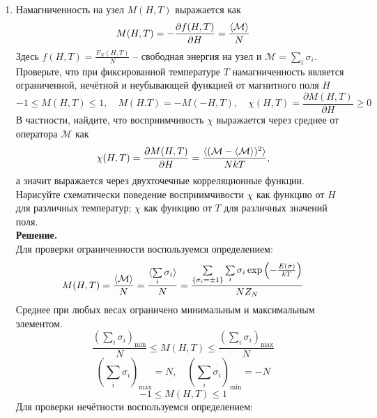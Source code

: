 \documentclass[12pt]{article}
\theoremstyle{definition}
\begin{document}
\begin{enumerate}
    \item Намагниченность на узел $M(H,T)$ выражается как
    \begin{equation}
        M(H,T)=-\frac{\partial f(H,T)}{\partial H}=\frac{\braket{\mathcal{M}}}{N}
    \end{equation}
    Здесь $f(H,T)=\frac{F_N(H,T)}{N}$ -- свободная энергия на узел и $\mathcal{M}=\sum\limits_i\sigma_i$. Проверьте, что при фиксированной температуре $T$ намагниченность является ограниченной, нечётной и неубывающей функцией от магнитного поля $H$
    \begin{equation}
        -1\leq M(H,T)\leq 1,\quad M(H.T)=-M(-H,T),\quad\chi(H,T)=\frac{\partial M(H,T)}{\partial H}\geq 0
    \end{equation}
    В частности, найдите, что восприимчивость $\chi$ выражается через среднее от оператора $\mathcal{M}$ как
    \begin{equation}
        \chi(H,T)=\frac{\partial M(H,T)}{\partial H}=\frac{\braket{(\mathcal{M}-\braket{\mathcal{M}})^2}}{NkT},
    \end{equation}
    а значит выражается через двухточечные корреляционные функции. Нарисуйте схематически поведение восприимчивости $\chi$ как функцию от $H$ для различных температур; $\chi$ как функцию от $T$ для различных значений поля.\\
    \textbf{Решение.}\\
    Для проверки ограниченности воспользуемся определением:
    \begin{equation}
        M(H,T)=\frac{\braket{\mathcal{M}}}{N}=\frac{\braket{\sum\limits_i\sigma_i}}{N}=\frac{\sum\limits_{\{\sigma_i=\pm1\}}\sum\limits_i\sigma_i\exp\left(-\frac{E(\sigma)}{kT}\right)}{NZ_N}
    \end{equation}
    Среднее при любых весах ограничено минимальным и максимальным элементом.
    \begin{equation}
        \frac{(\sum\limits_i\sigma_i)_\text{min}}{N}\leq M(H,T)\leq\frac{(\sum\limits_i\sigma_i)_\text{max}}{N}
    \end{equation}
    \begin{equation}
        (\sum\limits_i\sigma_i)_\text{max}=N,\quad (\sum\limits_i\sigma_i)_\text{min}=-N
    \end{equation}
    \begin{equation}
        \boxed{-1\leq M(H,T)\leq 1}
    \end{equation}
    Для проверки нечётности воспользуемся определением:

\end{enumerate}
\end{document}
